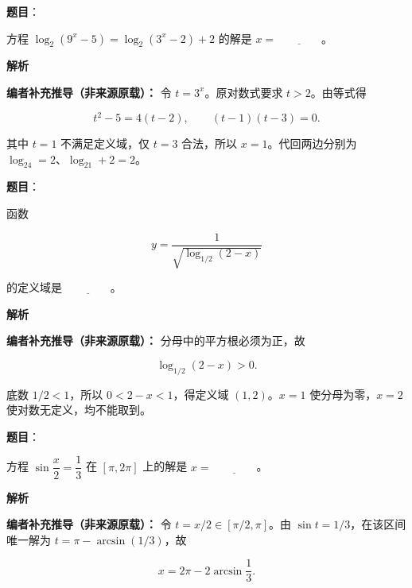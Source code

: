 \begin{answer}

\textbf{题目}：

方程 $\log_2(9^x-5)=\log_2(3^x-2)+2$ 的解是 $x=\underline{\qquad\qquad}$。

\textbf{解析}

\textbf{编者补充推导（非来源原载）：} 令 $t=3^x$。原对数式要求 $t>2$。由等式得

\nopagebreak[4]
\[t^2-5=4(t-2),\qquad (t-1)(t-3)=0.\]

其中 $t=1$ 不满足定义域，仅 $t=3$ 合法，所以 $x=1$。代回两边分别为 $\log_24=2$、$\log_21+2=2$。


\end{answer}
\begin{answer}

\textbf{题目}：

函数

\nopagebreak[4]
\[
y=\dfrac{1}{\sqrt{\log_{1/2}(2-x)}}
\]

的定义域是 $\underline{\qquad\qquad}$。

\textbf{解析}

\textbf{编者补充推导（非来源原载）：} 分母中的平方根必须为正，故

\nopagebreak[4]
\[\log_{1/2}(2-x)>0.\]

底数 $1/2<1$，所以 $0<2-x<1$，得定义域 $(1,2)$。$x=1$ 使分母为零，$x=2$ 使对数无定义，均不能取到。


\end{answer}
\begin{answer}

\textbf{题目}：

方程 $\sin\dfrac{x}{2}=\dfrac13$ 在 $[\pi,2\pi]$ 上的解是 $x=\underline{\qquad\qquad}$。

\textbf{解析}

\textbf{编者补充推导（非来源原载）：} 令 $t=x/2\in[\pi/2,\pi]$。由 $\sin t=1/3$，在该区间唯一解为 $t=\pi-\arcsin(1/3)$，故

\nopagebreak[4]
\[x=2\pi-2\arcsin\frac13.\]


\end{answer}
